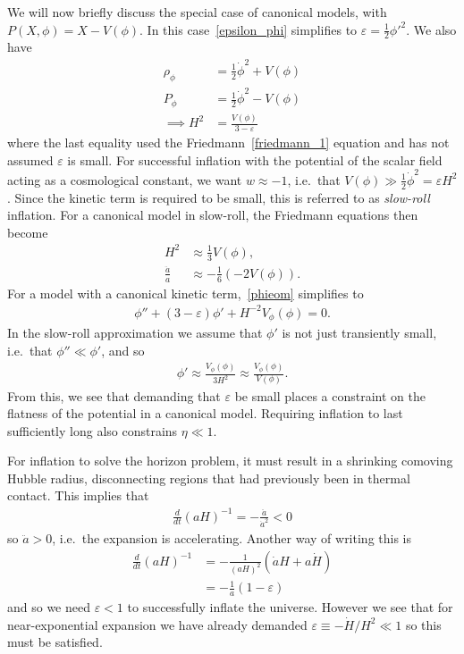 We will now briefly discuss the special case of canonical models,
with $P(X,\phi)=X-V(\phi)$.
In this case~\eqref{epsilon_phi} simplifies to
$\varepsilon = \frac{1}{2}{\phi'}^2$.
    We also have
    \begin{align}
        \rho_\phi &= \frac{1}{2}\dot{\phi}^2+V(\phi)\\
        P_\phi &= \frac{1}{2}\dot{\phi}^2-V(\phi)\\
        \implies H^2 &= \frac{V(\phi)}{3-\varepsilon}
    \end{align}
    where the last equality used the Friedmann~\eqref{friedmann_1} equation and
    has not assumed $\varepsilon$ is small.
    For successful inflation with the potential of the scalar field acting as a
    cosmological constant, we want $w\approx-1$,
    i.e.\ that $V(\phi)\gg\frac{1}{2}\dot{\phi}^2=\varepsilon H^2$. Since the kinetic term is required to
    be small, this is referred to as \textit{slow-roll} inflation.
    For a canonical model in slow-roll,
    the Friedmann equations then become
    \begin{align}
        H^2 &\approx \frac{1}{3}V(\phi),\\
        \frac{\ddot{a}}{a} &\approx -\frac{1}{6}\left(-2V(\phi)\right).
    \end{align}
    For a model with a canonical kinetic term,~\eqref{phieom} simplifies to
    \begin{align}
        \phi''+(3-\varepsilon)\phi'+H^{-2}V_{\phi}(\phi)=0.
    \end{align}
    In the slow-roll approximation we assume
    that $\phi'$ is not just transiently small,
    i.e.\ that $\phi''\ll\phi'$, and so
    \begin{align}
        \phi'\approx\frac{V_{\phi}(\phi)}{3H^2}\approx\frac{V_{\phi}(\phi)}{V(\phi)}.
    \end{align}
    From this, we see that demanding that $\varepsilon$ be small places a constraint
    on the flatness of the potential in a canonical model.
    Requiring inflation to last sufficiently long
    also constrains $\eta\ll1$.


    For inflation to solve the horizon problem, it must result in a shrinking comoving
    Hubble radius, disconnecting regions that had previously been in thermal contact.
    This implies that
    \begin{align}
        \frac{d}{dt}\left(aH\right)^{-1} = -\frac{\ddot{a}}{\dot{a}^2} < 0
    \end{align}
    so $\ddot{a}>0$, i.e.\ the expansion is accelerating. Another way of writing this is
    \begin{align}
        \frac{d}{dt}\left(aH\right)^{-1} &= -\frac{1}{(aH)^2}\left(\dot{a}H+a\dot{H}\right)\\
            &= -\frac{1}{a}\left(1-\varepsilon\right)
    \end{align}
    and so we need $\varepsilon<1$ to successfully inflate the universe.
    However we see that for near-exponential expansion we have already demanded
    $\varepsilon\equiv-\dot{H}/H^2\ll1$ so this must be satisfied.

